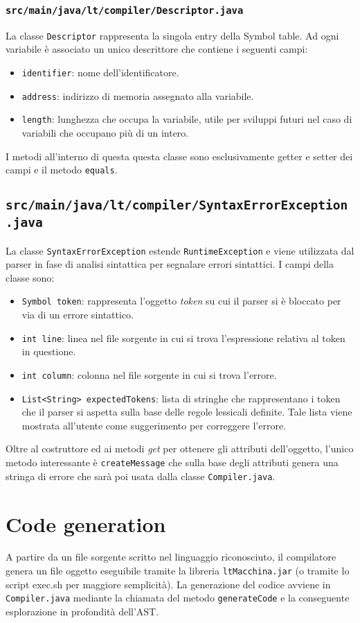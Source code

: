 \documentclass[10pt,a4paper]{article}
\begin{document}
\subsubsection{\texttt{src/main/java/lt/compiler/Descriptor.java}}
La classe \texttt{Descriptor} rappresenta la singola entry della Symbol table. Ad ogni variabile è associato un unico descrittore che contiene i seguenti campi:
\begin{itemize}
\item \texttt{identifier}: nome dell'identificatore.
\item \texttt{address}: indirizzo di memoria assegnato alla variabile.
\item \texttt{length}: lunghezza che occupa la variabile, utile per sviluppi futuri nel caso di variabili che occupano più di un intero.
\end{itemize}
I metodi all'interno di questa questa classe sono esclusivamente getter e setter dei campi e il metodo \texttt{equals}.

\subsection{\texttt{src/main/java/lt/compiler/SyntaxErrorException.java}}
La classe \texttt{SyntaxErrorException} estende \texttt{RuntimeException} e viene utilizzata dal parser in fase di analisi sintattica per segnalare errori sintattici. I campi della classe sono:
\begin{itemize}
\item \texttt{Symbol token}: rappresenta l'oggetto \textit{token} su cui il parser si è bloccato per via di un errore sintattico.
\item \texttt{int line}: linea nel file sorgente in cui si trova l'espressione relativa al token in questione.
\item \texttt{int column}: colonna nel file sorgente in cui si trova l'errore.
\item \texttt{List<String> expectedTokens}: lista di stringhe che rappresentano i token che il parser si aspetta sulla base delle regole lessicali definite. Tale lista viene mostrata all'utente come suggerimento per correggere l'errore.
\end{itemize}
Oltre al costruttore ed ai metodi \textit{get} per ottenere gli attributi dell'oggetto, l'unico metodo interessante è \texttt{createMessage} che sulla base degli attributi genera una stringa di errore che sarà poi usata dalla classe \texttt{Compiler.java}.

\section{Code generation}
A partire da un file sorgente scritto nel linguaggio riconosciuto, il compilatore genera un file oggetto eseguibile tramite la libreria \texttt{ltMacchina.jar} (o tramite lo script exec.sh per maggiore semplicità). La generazione del codice avviene in \texttt{Compiler.java} mediante la chiamata del metodo \texttt{generateCode} e la conseguente esplorazione in profondità dell'AST.
\end{document}

